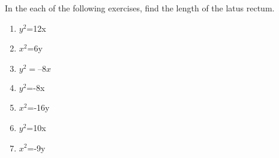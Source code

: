 In the each of the following exercises, find the length of the latus rectum.
\begin{enumerate}[label=\thesubsection.\arabic*,ref=\thesubsection.\theenumi]
\item $y^2$=12x 
\label{chapters/11/11/2/1}
\\
\solution
%
\item $x^2$=6y 
\\
\solution
%
\item 
$y^2 = –8x$
\\
\solution
%
\item $y^2$=-8x

\item $x^2$=-16y
\\
\solution
%

\item $y^2$=10x  

\item $x^2$=-9y  
\end{enumerate}

